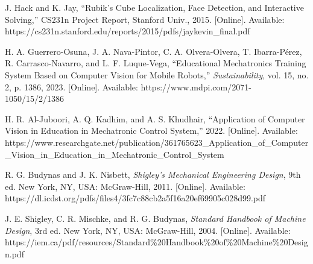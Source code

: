 \begin{thebibliography}{14}
J. Hack and K. Jay, ``Rubik's Cube Localization, Face Detection, and Interactive Solving,'' CS231n Project Report, Stanford Univ., 2015. [Online]. Available: https://cs231n.stanford.edu/reports/2015/pdfs/jaykevin\_final.pdf

H. A. Guerrero-Osuna, J. A. Nava-Pintor, C. A. Olvera-Olvera, T. Ibarra-Pérez, R. Carrasco-Navarro, and L. F. Luque-Vega, ``Educational Mechatronics Training System Based on Computer Vision for Mobile Robots,'' \textit{Sustainability}, vol. 15, no. 2, p. 1386, 2023. [Online]. Available: https://www.mdpi.com/2071-1050/15/2/1386

H. R. Al-Juboori, A. Q. Kadhim, and A. S. Khudhair, ``Application of Computer Vision in Education in Mechatronic Control System,'' 2022. [Online]. Available: https://www.researchgate.net/publication/361765623\_Application\_of\_Computer\_Vision\_in\_Education\_in\_Mechatronic\_Control\_System

R. G. Budynas and J. K. Nisbett, \textit{Shigley's Mechanical Engineering Design}, 9th ed. New York, NY, USA: McGraw-Hill, 2011. [Online]. Available: https://dl.icdst.org/pdfs/files4/3fc7c88cb2a5f16a20ef69905c028d99.pdf

J. E. Shigley, C. R. Mischke, and R. G. Budynas, \textit{Standard Handbook of Machine Design}, 3rd ed. New York, NY, USA: McGraw-Hill, 2004. [Online]. Available: https://iem.ca/pdf/resources/Standard\%20Handbook\%20of\%20Machine\%20Design.pdf

\end{thebibliography}